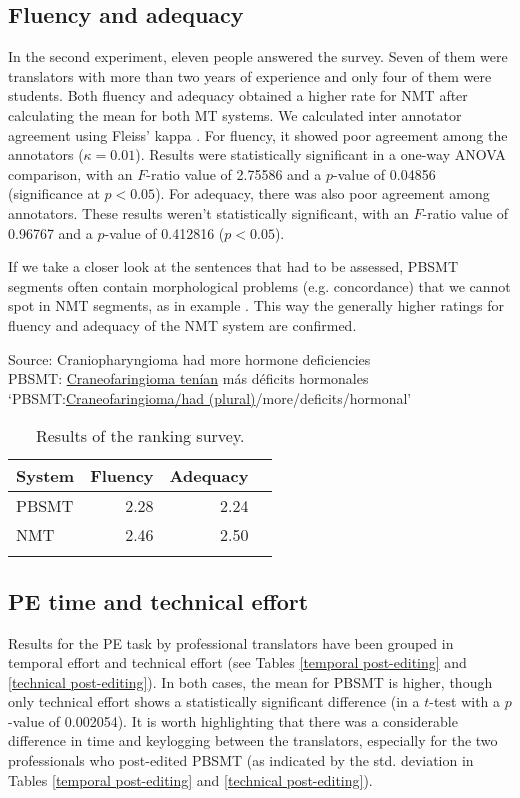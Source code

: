 \documentclass[output=paper]{langsci/langscibook}
\begin{document}
\subsection{Fluency and adequacy}
In the second experiment, eleven people answered the survey. Seven of them were translators with more than two years of experience and only four of them were students. Both fluency and adequacy obtained a higher rate for NMT after calculating the mean for both MT systems. We calculated inter annotator agreement using Fleiss' kappa \citep{fleiss1971}. For fluency, it showed poor agreement among the annotators ($\kappa=0.01$). Results were statistically significant in a one-way ANOVA comparison, with an $F$-ratio value of 2.75586 and a $p$-value of 0.04856 (significance at $p<0.05$). For adequacy, there was also poor agreement among annotators. These results weren't statistically significant, with an $F$-ratio value of 0.96767 and a $p$-value of 0.412816 ($p<0.05$). 

If we take a closer look at the sentences that had to be assessed, PBSMT segments often contain morphological problems (e.g. concordance) that we cannot spot in NMT segments, as in example . This way the generally higher ratings for fluency and adequacy of the NMT system are confirmed. 



\ea\label{example1}
\gll Source: Craniopharyngioma had more hormone deficiencies\\
PBSMT: \underline{Craneofaringioma tenían} más déficits hormonales\\
\glt `PBSMT:\underline{Craneofaringioma/had (plural)}/more/deficits/hormonal'
\z

\begin{table}
\begin{tabularx}{.66\textwidth}{Xrrr}
\lsptoprule
{System} & {Fluency} & {Adequacy}\\
\midrule
PBSMT & 2.28 & 2.24 \\
NMT & 2.46 & 2.50 \\
\lspbottomrule
\end{tabularx}
\caption{\label{eval-mteval1reference2}Results of the ranking survey.}
\end{table}

\subsection{PE time and technical effort}
Results for the PE task by professional translators have been grouped in temporal effort and technical effort (see Tables \ref{temporal post-editing} and \ref{technical post-editing}). In both cases, the mean for PBSMT is higher, though only technical effort shows a statistically significant difference (in a $t$-test with a $p$-value of 0.002054). It is worth highlighting that there was a considerable difference in time and keylogging between the translators, especially for the two professionals who post-edited PBSMT (as indicated by the std. deviation in Tables \ref{temporal post-editing} and \ref{technical post-editing}).
\end{document}
